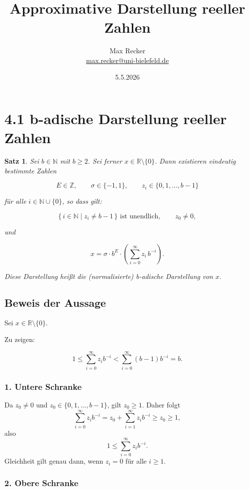 \documentclass{article}
\title{Approximative Darstellung reeller Zahlen}
\date{5.5.2026}
\author{Max Recker\\ \url{max.recker@uni-bielefeld.de}}
\newcommand{\R}{\mathbb{R}}%
\newtheorem{thm}{Satz}
\begin{document}
\maketitle


\section{4.1 b-adische Darstellung reeller Zahlen}

\begin{thm}
Sei \(b\in\mathbb{N}\) mit \(b\geq 2\). Sei ferner \(x\in\mathbb{R}\setminus\{0\}\). Dann existieren eindeutig bestimmte Zahlen

\[
E\in\mathbb{Z}, \qquad \sigma\in\{-1,1\}, \qquad z_i\in\{0,1,\dots,b-1\}
\]

für alle \(i\in\mathbb{N}\cup\{0\}\), so dass gilt:

\[
\{\, i\in\mathbb{N}\mid z_i\neq b-1 \,\}
\text{ ist unendlich},
\qquad z_0\neq 0,
\]

und

\[
x=\sigma\cdot b^E \cdot \left(\sum_{i=0}^{\infty} z_i\, b^{-i}\right).
\]

Diese Darstellung heißt die \emph{(normalisierte) b-adische Darstellung} von \(x\).
\end{thm}



\subsection*{Beweis der Aussage}

Sei \(x\in\R\setminus\{0\}\).

Zu zeigen:

\[
1\leq \sum_{i=0}^{\infty} z_i b^{-i}
<
\sum_{i=0}^{\infty}(b-1)b^{-i}=b.
\]

\subsubsection*{1. Untere Schranke}

Da \(z_0\neq 0\) und \(z_0\in\{0,1,\dots,b-1\}\), gilt \(z_0\geq 1\). Daher folgt
\[
\sum_{i=0}^{\infty} z_i b^{-i}
=
z_0+\sum_{i=1}^{\infty} z_i b^{-i}
\geq z_0\geq 1,
\]
also
\[
1\leq \sum_{i=0}^{\infty} z_i b^{-i}.
\]
Gleichheit gilt genau dann, wenn \(z_i=0\) für alle \(i\geq 1\).

\subsubsection*{2. Obere Schranke}
\end{document}
